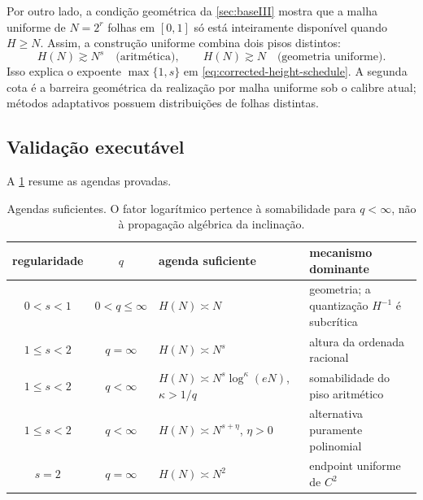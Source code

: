 \documentclass[11pt,a4paper]{article}
\theoremstyle{definition}
\theoremstyle{remark}
\begin{document}
Por outro lado, a condição geométrica da \cref{sec:baseIII} mostra que a malha
uniforme de $N=2^r$ folhas em $[0,1]$ só está inteiramente disponível quando
$H\ge N$. Assim, a construção uniforme combina dois pisos distintos:
\begin{equation}
 H(N)\gtrsim N^s\quad\text{(aritmética)},
 \qquad
 H(N)\gtrsim N\quad\text{(geometria uniforme)}.
 \label{eq:two-height-floors}
\end{equation}
Isso explica o expoente $\max\{1,s\}$ em
\eqref{eq:corrected-height-schedule}. A segunda cota é a barreira geométrica
da realização por malha uniforme sob o calibre atual; métodos adaptativos
possuem distribuições de folhas distintas.

\subsection{Validação executável}

A \cref{tab:height-schedules} resume as agendas provadas.
\begin{table}[t]
 \centering
 \small
 \begin{tabularx}{\linewidth}{@{}cclX@{}}
\toprule
regularidade & $q$ & agenda suficiente & mecanismo dominante\\
\midrule
$0<s<1$ & $0<q\le\infty$ & $H(N)\asymp N$ & geometria; a quantização $H^{-1}$ é subcrítica\\
$1\le s<2$ & $q=\infty$ & $H(N)\asymp N^s$ & altura da ordenada racional\\
$1\le s<2$ & $q<\infty$ & $H(N)\asymp N^s\log^\kappa(eN)$, $\kappa>1/q$ & somabilidade do piso aritmético\\
$1\le s<2$ & $q<\infty$ & $H(N)\asymp N^{s+\eta}$, $\eta>0$ & alternativa puramente polinomial\\
$s=2$ & $q=\infty$ & $H(N)\asymp N^2$ & endpoint uniforme de $C^2$\\
\bottomrule
\end{tabularx}

 \caption{Agendas suficientes. O fator logarítmico pertence à
 somabilidade para $q<\infty$, não à propagação algébrica da inclinação.}
 \label{tab:height-schedules}
\end{table}
\end{document}
